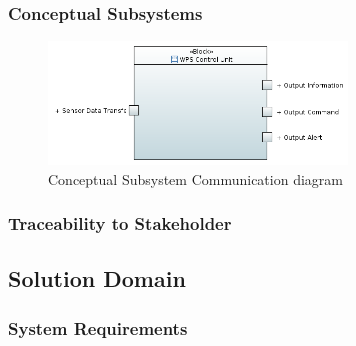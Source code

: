 \documentclass[11pt]{article}
\begin{document}
\subsubsection{Conceptual Subsystems}

\begin{figure}[H]
  \includegraphics[width=300px]{../diagrams/conceptual-subsystem-communication-wps.png}
  \caption{Conceptual Subsystem Communication diagram}
  \label{fig:Conceptual Subsystem}
\end{figure}

\subsubsection{Traceability to Stakeholder}

\subsection{Solution Domain}

\subsubsection{System Requirements}
\end{document}
